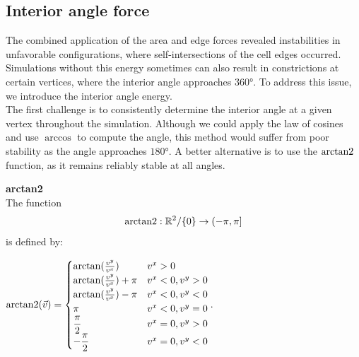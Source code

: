 \subsection{Interior angle force}
The combined application of the area and edge forces revealed instabilities in unfavorable configurations, where self-intersections of the cell edges occurred. 
Simulations without this energy sometimes can also result in constrictions at certain vertices, where the interior angle approaches $360$°. 
To address this issue, we introduce the interior angle energy. \\
The first challenge is to consistently determine the interior angle at a given vertex throughout the simulation.
Although we could apply the law of cosines and use $\arccos$ to compute the angle, this method would suffer from poor stability as the angle approaches $180$°.
A better alternative is to use the $\operatorname{arctan2}$ function, as it remains reliably stable at all angles. \\

\begin{definition} \textbf{arctan2} \\
	The function $$\operatorname{arctan2}:\mathbb{R}^2/\{0\} \rightarrow (-\pi, \pi]$$ is defined by:
	\begin{center}
		$ \operatorname{arctan2}(\vec{v}) = 
		\begin{cases}
			\arctan(\frac{v^{y}}{v^{x}}) & v^{x} > 0 \\
			\arctan(\frac{v^{y}}{v^{x}}) + \pi & v^{x} < 0, v^{y} > 0 \\
			\arctan(\frac{v^{y}}{v^{x}}) - \pi & v^{x} < 0, v^{y} < 0 \\
			\pi & v^{x} < 0, v^{y} = 0 \\
			\dfrac{\pi}{2} & v^{x} = 0, v^{y} > 0 \\ 		
			- \dfrac{\pi}{2} & v^{x} = 0, v^{y} < 0 \\ 
		\end{cases}. $
	\end{center}
\end{definition}

